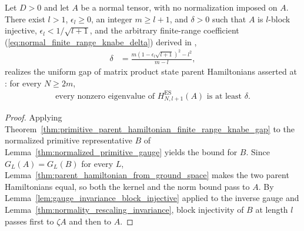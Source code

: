 \begin{lemma}
    \label{thm:normal_parent_hamiltonian_finite_range_knabe_gap}
    \leanok
    Let $D>0$ and let $A$ be a normal tensor, with no normalization imposed on
    $A$.  There exist $l>1$, $\epsilon_l\geq0$, an integer $m\geq l+1$, and
    $\delta>0$ such that $A$ is $l$-block injective,
    $\epsilon_l<1/\sqrt{l+1}$, and the arbitrary finite-range coefficient
    (\ref{eq:normal_finite_range_knabe_delta}) derived in
    ,
    \begin{align}
        \delta
         & =\frac{m\left(1-\epsilon_l\sqrt{l+1}\right)^2-l^2}{m-l},
        \label{eq:normal_finite_range_knabe_delta}
    \end{align}
    realizes the uniform gap of matrix product state parent Hamiltonians
    asserted at \cite[lines~2183--2187]{Cirac2021Matrix}: for every
    $N\geq2m$,
    \begin{align}
        \text{every nonzero eigenvalue of }H_{N,l+1}^{\mathrm{ES}}(A)
        \text{ is at least }\delta.
        \label{eq:normal_finite_range_knabe_gap}
    \end{align}
\end{lemma}

\begin{proof}
    \leanok
    Applying Theorem~\ref{thm:primitive_parent_hamiltonian_finite_range_knabe_gap}
    to the normalized primitive representative $B$ of
    Lemma~\ref{thm:normalized_primitive_gauge} yields the bound for $B$.
    Since $G_L(A)=G_L(B)$ for every $L$,
    Lemma~\ref{thm:parent_hamiltonian_from_ground_space} makes the two
    parent Hamiltonians equal, so both the kernel and the norm bound pass to
    $A$.  By Lemma~\ref{lem:gauge_invariance_block_injective} applied to the
    inverse gauge and Lemma~\ref{thm:normality_rescaling_invariance}, block
    injectivity of $B$ at length $l$ passes first to $\zeta A$ and then to $A$.
\end{proof}

